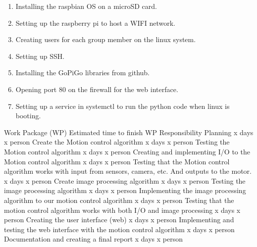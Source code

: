 \documentclass[11pt]{article}
\begin{document}
\begin{enumerate}
    \item Installing the raspbian OS on a microSD card. 
    \item Setting up the raspberry pi to host a WIFI network. 
    \item Creating users for each group member on the linux system.
    \item Setting up SSH. 
    \item Installing the GoPiGo libraries from github. 
    \item Opening port 80 on the firewall for the web interface. 
    \item Setting up a service in systemctl to run the python code when linux is booting.
\end{enumerate}

Work Package (WP)
Estimated time to finish WP
Responsibility
Planning
x days
x person
Create the Motion control algorithm 
x days
x person
Testing the Motion control algorithm
x days 
x person
Creating and implementing I/O to the Motion control algorithm
x days 
x person
Testing that the Motion control algorithm works with input from sensors, camera, etc. And outputs to the motor. 
x days
x person
Create image processing algorithm 
x days
x person
Testing the image processing algorithm
x days 
x person
Implementing the image processing algorithm to our motion control algorithm 
x days
x person
Testing that the motion control algorithm works with both I/O and image processing
x days 
x person
Creating the user interface (web)
x days
x person
Implementing and testing the web interface with the motion control algorithm 
x days 
x person
Documentation and creating a final report
x days 
x person
\end{document}
